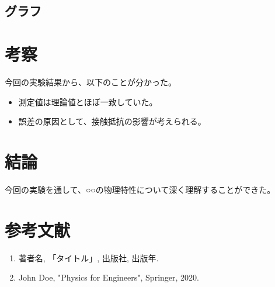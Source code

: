 \documentclass[a4paper, twocolumn]{article} %
\begin{document}
\subsection{グラフ}


\section{考察}
今回の実験結果から、以下のことが分かった。
\begin{itemize}
    \item 測定値は理論値とほぼ一致していた。
    \item 誤差の原因として、接触抵抗の影響が考えられる。
\end{itemize}

\section{結論}
今回の実験を通して、○○の物理特性について深く理解することができた。

\section*{参考文献}
\begin{enumerate}
    \item 著者名, 「タイトル」, 出版社, 出版年.
    \item John Doe, "Physics for Engineers", Springer, 2020.
\end{enumerate}
\end{document}
